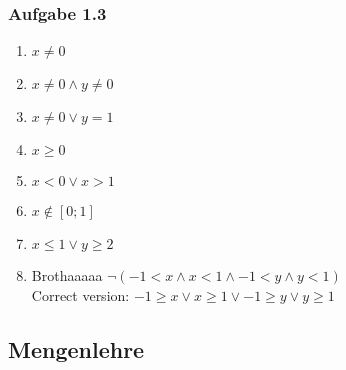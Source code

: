 \documentclass[11pt, a4paper]{article}
\begin{document}
\subsubsection{Aufgabe 1.3}
\begin{enumerate}[label=\alph*)]
\item $x \neq 0$
\item $x \neq 0 \land y \neq 0$
\item $x \neq 0 \lor y = 1$
\item $x \ge 0$
\item $x < 0 \lor x > 1$
\item $x \notin [0;1]$
\item $x \le 1 \lor y \ge 2$
\item Brothaaaaa $\lnot(-1 < x \land x < 1 \land -1 < y \land y < 1)$\\Correct version: $-1 \ge x \lor x \ge 1 \lor -1 \ge y \lor y \ge 1$
\end{enumerate}

\subsection{Mengenlehre}
\end{document}
